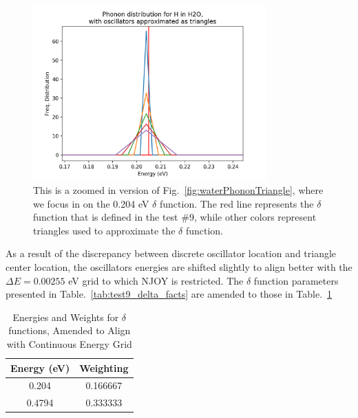 \documentclass[Master.tex]{subfiles}
\begin{document}
            \begin{figure}[h]
              \begin{center}
              \includegraphics[width=0.8\textwidth]{waterPhononDistTrianglesZoomed}
                \caption{This is a zoomed in version of Fig.~\ref{fig:waterPhononTriangle}, where we focus in on the 0.204 eV $\delta$ function. The red line represents the $\delta$ function that is defined in the test \#9, while other colors represent triangles used to approximate the $\delta$ function.}
              \label{fig:waterPhononTriangleZoomed}
              \end{center}
            \end{figure}
            As a result of the discrepancy between discrete oscillator location and triangle center location, the oscillators energies are shifted slightly to align better with the $\Delta E=0.00255$ eV grid to which NJOY is restricted. The $\delta$ function parameters presented in Table.~\ref{tab:test9_delta_facts} are amended to those in Table.~\ref{tab:amended_delta_facts}



              \begin{table}
              	\centering
                \caption[Energies and Weights for $\delta$ functions, Amended to Align with Continuous Energy Grid]{Energies and Weights for $\delta$ functions, Amended to Align with Continuous Energy Grid}
              	\label{tab:amended_delta_facts}
                       \begin{tabular}{ |c|c| }\hline
                              Energy (eV)& Weighting\\\hline
                               0.204& 0.166667\\\hline
                               0.4794 & 0.333333 \\\hline
                       \end{tabular}\\[1ex]
              \end{table}
\end{document}
